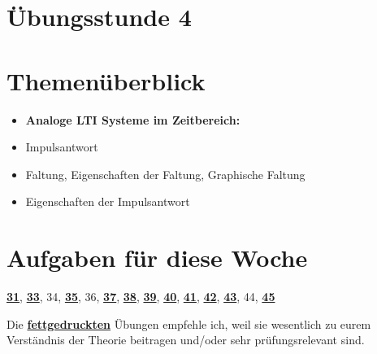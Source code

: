 \documentclass[11pt]{article}
\begin{document}
\thispagestyle{firstpage}

\setlength{\headheight}{1 \baselineskip}  %
\setlength{\parindent}{0pt}  %
\setlength{\parskip}{\baselineskip}  %

\vspace*{-5px}
\section*{Übungsstunde 4}

\section*{Themenüberblick}
\begin{itemize}
    \item \textbf{Analoge LTI Systeme im Zeitbereich:}
    \item[] Impulsantwort
    \item[] Faltung, Eigenschaften der Faltung, Graphische Faltung
    \item[] Eigenschaften der Impulsantwort
\end{itemize}

\section*{Aufgaben für diese Woche}
\vspace{-0.5cm}

\underline{\textbf{31}}, \underline{\textbf{33}}, 34, \underline{\textbf{35}}, 36, \underline{\textbf{37}}, \underline{\textbf{38}}, \underline{\textbf{39}}, \underline{\textbf{40}}, \underline{\textbf{41}}, \underline{\textbf{42}}, \underline{\textbf{43}}, 44, \underline{\textbf{45}}\\
\vspace{-0.5cm}

Die \underline{\textbf{fettgedruckten}} Übungen empfehle ich, weil sie wesentlich zu eurem Verständnis der Theorie beitragen und/oder sehr prüfungsrelevant sind.

\vfill \null
\pagebreak
\end{document}

